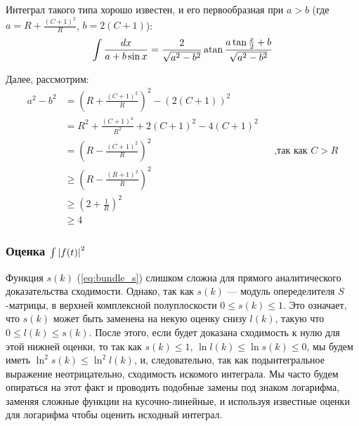 Интеграл такого типа хорошо известен, и его первообразная при $a > b$ (где $a = R + \frac{(C + 1)^2}{R}$, $b = 2 (C + 1)$):
\[
\int \frac{dx}{a + b \sin x} = \frac{2}{\sqrt{a^2 - b^2}} \atan \frac{a \tan \frac{x}{2} + b}{\sqrt{a^2 - b^2}}
\]

Далее, рассмотрим:
\begin{align*}
a^2 - b^2
& =  (R + \frac{(C + 1)^2}{R})^2 - (2 (C + 1))^2\\
& =  R^2 + \frac{(C+1)^4}{R^2} + 2 (C+1)^2 - 4 (C + 1)^2 \\
& =  (R - \frac{(C + 1)^2}{R})^2 && \text{,так как $C > R$} \\
&\ge (R - \frac{(R + 1)^2}{R})^2 \\
&\ge (2 + \frac{1}{R})^2 \\
&\ge 4
\end{align*}





\subsubsection{Оценка $\int \abs{f(t)}^2$}
Функция $s(k)$ (\ref{eq:bundle_s}) слишком сложна для прямого аналитического доказательства сходимости. Однако, так как $s(k)$ — модуль опеределителя $S$-матрицы, в верхней комплексной полуплоскости $0 \le s(k) \le 1$. Это означает, что $s(k)$ может быть заменена на некую оценку снизу $l(k)$, такую что $0 \le l(k) \le s(k)$. После этого, если будет доказана сходимость к нулю для этой нижней оценки, то так как $s(k) \le 1$, $\ln l(k) \le \ln s(k) \le 0$, мы будем иметь $\ln^2 s(k) \le \ln^2 l(k)$, и, следовательно, так как подынтегральное выражение неотрицательно, сходимость искомого интеграла. Мы часто будем опираться на этот факт и проводить подобные замены под знаком логарифма, заменяя сложные функции на кусочно-линейные, и используя известные оценки для логарифма чтобы оценить исходный интеграл.

